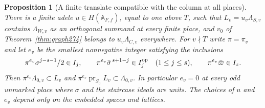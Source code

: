 \documentclass[a4paper,11pt]{article}
\newtheorem{proposition}{Proposition}[section]
\theoremstyle{definition}
\theoremstyle{remark}
\numberwithin{equation}{section}
\begin{document}
\begin{proposition}[A finite translate compatible with the column at all places]\leavevmode
\label{prop:lattices277}
There is a finite adele \(u\in H(\mathbb A_{F,f})\), equal to
one above \(T\), such that \(L_v=u_v\Lambda_{S,v}\) contains
\(\Lambda_{W,v}\) as an orthogonal summand at every finite place,
and \(v_0\) of Theorem~\ref{thm:graph274} belongs to
\(u_v\Lambda_{C,v}\) everywhere. For \(v\nmid T\) write
\(\pi=\pi_v\) and let \(e_v\) be the smallest nonnegative
integer satisfying the inclusions
\[
 \pi^{e_v}\sigma^{j-s-1}/2\in I_j,\qquad
 \pi^{e_v}\bar\sigma^{\,s+1-j}\in I_j^{\rm op}\quad(1\le j\le s),
 \qquad \pi^{e_v}\bar\varpi\in I_z .
\]
Then \(\pi^{e_v}\Lambda_{0,v}\subset L_v\) and
\(\pi^{e_v}\operatorname{pr}_{S_0}L_v\subset\Lambda_{0,v}\).
In particular \(e_v=0\) at every odd unmarked place where
\(\sigma\) and the staircase ideals are units. The choices of
\(u\) and \(e_v\) depend only on the embedded spaces and
lattices.
\end{proposition}
\end{document}
